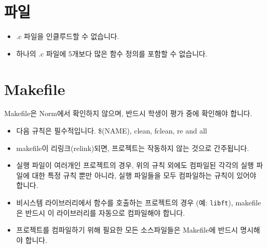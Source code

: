 \documentclass{42-ko}
\begin{document}
    \section{파일}

        \begin{itemize}

            \item .c 파일을 인클루드할 수 없습니다.

            \item 하나의 .c 파일에 5개보다 많은 함수 정의를 포함할 수 없습니다.

        \end{itemize}
        \newpage


    \section{Makefile}

            Makefile은 Norm에서 확인하지 않으며, 반드시 학생이 평가 중에 확인해야 합니다.
            \begin{itemize}

                \item 다음 규칙은 필수적입니다. \$(NAME), clean, fclean, re and all

                \item makefile이 리링크(relink)되면, 프로젝트는 작동하지 않는 것으로 간주됩니다.

                \item 실행 파일이 여러개인 프로젝트의 경우, 위의 규칙 외에도
                  컴파일된 각각의 실행 파일에 대한 특정 규칙 뿐만 아니라, 실행 파일들을 
                  모두 컴파일하는 규칙이 있어야 합니다.

                  \item 비시스템 라이브러리에서 함수를 호출하는 프로젝트의 경우
                  (예: \texttt{libft}), makefile은 반드시 이 라이브러리를 자동으로
                  컴파일해야 합니다.

                  \item 프로젝트를 컴파일하기 위해 필요한 모든 소스파일들은 
                    Makefile에 반드시 명시해야 합니다.

            \end{itemize}
\end{document}
